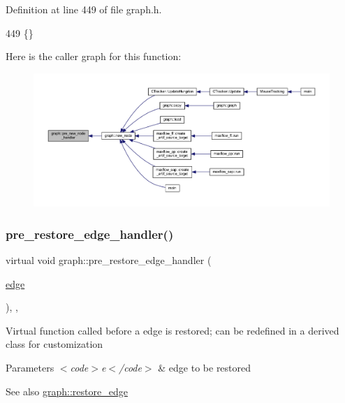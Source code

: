 Definition at line 449 of file graph.\+h.


\begin{DoxyCode}
449 \{\}
\end{DoxyCode}
Here is the caller graph for this function\+:
\nopagebreak
\begin{figure}[H]
\begin{center}
\leavevmode
\includegraphics[width=350pt]{classgraph_afb7606eaa8d673b6599af24437c0546c_icgraph}
\end{center}
\end{figure}
\mbox{\label{classgraph_a569d227d9f4914278a143d52139e3303}} 
\subsubsection{\texorpdfstring{pre\+\_\+restore\+\_\+edge\+\_\+handler()}{pre\_restore\_edge\_handler()}}
{\footnotesize\ttfamily virtual void graph\+::pre\+\_\+restore\+\_\+edge\+\_\+handler (\begin{DoxyParamCaption}\item[{\mbox{\hyperlink{classedge}{edge}}}]{ }\end{DoxyParamCaption})\hspace{0.3cm}{\ttfamily [inline]}, {\ttfamily [virtual]}, {\ttfamily [inherited]}}

Virtual function called before a edge is restored; can be redefined in a derived class for customization


\begin{DoxyParams}{Parameters}
{\em $<$code$>$e$<$/code$>$} & edge to be restored \\
\hline
\end{DoxyParams}
\begin{DoxySeeAlso}{See also}
\mbox{\hyperlink{classgraph_a2e5426682a0897b9f9104b019970bedc}{graph\+::restore\+\_\+edge}} 
\end{DoxySeeAlso}


